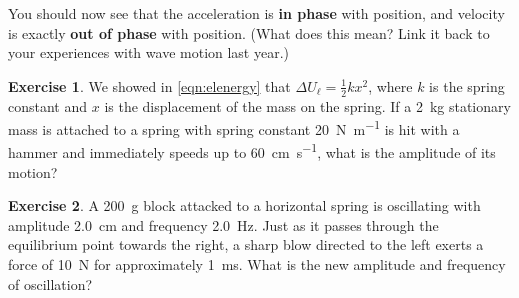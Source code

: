 \documentclass[a4paper]{amsbook}
\theoremstyle{definition}
\newtheorem{exercise}{Exercise}
\numberwithin{exercise}{chapter}
\numberwithin{exercise}{chapter}
\begin{document}
You should now see that the acceleration is \textbf{in phase} with position, and velocity is exactly \textbf{out of phase}
with position. (What does this mean? Link it back to your experiences with wave motion last year.)

\begin{exercise}
  We showed in \cref{eqn:elenergy} that $ \Delta U_{\ell} = \frac{1}{2} kx^2 $, where $ k $ is the spring constant and $ x $ is the displacement
  of the mass on the spring. If a \SI{2}{\kilo\gram} stationary mass is attached to a spring with spring constant \SI{20}{\newton\per\metre} is
  hit with a hammer and immediately speeds up to \SI{60}{\centi\metre\per\second}, what is the amplitude of its motion?
\end{exercise}

\begin{exercise}
  A \SI{200}{\gram} block attacked to a horizontal spring is oscillating with amplitude \SI{2.0}{\centi\metre} and frequency \SI{2.0}{\hertz}.
  Just as it passes through the equilibrium point towards the right, a sharp blow directed to the left exerts a force of \SI{10}{\newton} for
  approximately \SI{1}{\milli\second}. What is the new amplitude and frequency of oscillation?
\end{exercise}
\end{document}
